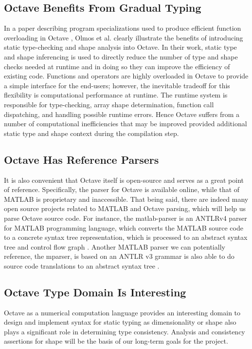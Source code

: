 \subsection{Octave Benefits From Gradual Typing}
In a paper describing program specializations used to produce efficient function overloading in Octave \cite{olmos2003turning}, Olmos et al. clearly illustrate the benefits of introducing static type-checking and shape analysis into Octave. In their work, static type and shape inferencing is used to directly reduce the number of type and shape checks needed at runtime and in doing so they can improve the efficiency of existing code. Functions and operators are highly overloaded in Octave to provide a simple interface for the end-users; however, the inevitable tradeoff for this flexibility is computational performance at runtime. The runtime system is responsible for type-checking, array shape determination, function call dispatching, and handling possible runtime errors. Hence Octave suffers from a number of computational inefficiencies that may be improved provided additional static type and shape context during the compilation step.

\subsection{Octave Has Reference Parsers}
It is also convenient that Octave itself is open-source and serves as a great point of reference. Specifically, the parser for Octave is available online, while that of MATLAB is proprietary and inaccessible. That being said, there are indeed many open source projects related to MATLAB and Octave parsing, which will help us parse Octave source code. For instance, the matlab-parser is an ANTLRv4 parser for MATLAB programming language, which converts the MATLAB source code to a concrete syntax tree representation, which is processed to an abstract syntax tree and control flow graph \cite{ericharley2013matlab}. Another MATLAB parser we can potentially reference, the mparser, is based on an ANTLR v3 grammar is also able to do source code translations to an abstract syntax tree \cite{ewiger2013decade}.

\subsection{Octave Type Domain Is Interesting}
Octave as a numerical computation language provides an interesting domain to design and implement syntax for static typing as dimensionality or shape also plays a significant role in determining type consistency. Analysis and consistency assertions for shape will be the basis of our long-term goals for the project.

